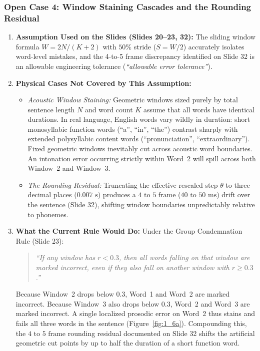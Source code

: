 \documentclass[11pt,a4paper]{article}
\begin{document}
\subsubsection*{Open Case 4: Window Staining Cascades and the Rounding Residual}

\begin{enumerate}
    \item \textbf{Assumption Used on the Slides (Slides 20--23, 32):} The sliding window formula $W = 2N/(K+2)$ with $50\%$ stride ($S = W/2$) accurately isolates word-level mistakes, and the 4-to-5 frame discrepancy identified on Slide 32 is an allowable engineering tolerance (\textit{``allowable error tolerance''}).
    \item \textbf{Physical Cases Not Covered by This Assumption:}
    \begin{itemize}
        \item \textit{Acoustic Window Staining:} Geometric windows sized purely by total sentence length $N$ and word count $K$ assume that all words have identical durations. In real language, English words vary wildly in duration: short monosyllabic function words (``a'', ``in'', ``the'') contrast sharply with extended polysyllabic content words (``pronunciation'', ``extraordinary''). Fixed geometric windows inevitably cut across acoustic word boundaries. An intonation error occurring strictly within Word~2 will spill across both Window~2 and Window~3.
        \item \textit{The Rounding Residual:} Truncating the effective rescaled step $\theta$ to three decimal places ($0.007\text{ s}$) produces a $4\text{ to }5\text{ frame}$ ($40\text{ to }50\text{ ms}$) drift over the sentence (Slide 32), shifting window boundaries unpredictably relative to phonemes.
    \end{itemize}
    \item \textbf{What the Current Rule Would Do:} Under the Group Condemnation Rule (Slide 23):
    \begin{quote}
    \textit{``If any window has $r < 0.3$, then all words falling on that window are marked incorrect, even if they also fall on another window with $r \ge 0.3$.''}
    \end{quote}
    Because Window~2 drops below $0.3$, Word~1 and Word~2 are marked incorrect. Because Window~3 also drops below $0.3$, Word~2 and Word~3 are marked incorrect. A single localized prosodic error on Word~2 thus stains and fails all three words in the sentence (Figure~\ref{fig:1_6a}). Compounding this, the $4\text{ to }5\text{ frame}$ rounding residual documented on Slide 32 shifts the artificial geometric cut points by up to half the duration of a short function word.

\end{enumerate}
\end{document}
